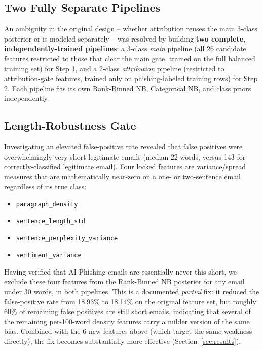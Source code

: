 \documentclass[11pt]{article}
\begin{document}
\subsection{Two Fully Separate Pipelines}
An ambiguity in the original design -- whether attribution reuses the main 3-class posterior or
is modeled separately -- was resolved by building \textbf{two complete, independently-trained
pipelines}: a 3-class \emph{main} pipeline (all 26 candidate features restricted to those that
clear the main gate, trained on the full balanced training set) for Step 1, and a 2-class
\emph{attribution} pipeline (restricted to attribution-gate features, trained only on
phishing-labeled training rows) for Step 2. Each pipeline fits its own Rank-Binned NB,
Categorical NB, and class priors independently.

\subsection{Length-Robustness Gate}
Investigating an elevated false-positive rate revealed that false positives were overwhelmingly
very short legitimate emails (median 22 words, versus 143 for correctly-classified legitimate
email). Four locked features are variance/spread measures that are mathematically near-zero on a
one- or two-sentence email regardless of its true class:
\begin{itemize}[nosep]
    \item \texttt{paragraph\_density}
    \item \texttt{sentence\_length\_std}
    \item \texttt{sentence\_perplexity\_variance}
    \item \texttt{sentiment\_variance}
\end{itemize}
Having verified that AI-Phishing emails are essentially never this short, we exclude these
four features from the Rank-Binned NB posterior for any email under 30 words, in both pipelines.
This is a documented \emph{partial} fix: it reduced the false-positive rate from 18.93\% to
18.14\% on the original feature set, but roughly 60\% of remaining false positives are still
short emails, indicating that several of the remaining per-100-word density features carry a
milder version of the same bias. Combined with the 6 new features above (which target the same
weakness directly), the fix becomes substantially more effective (Section~\ref{sec:results}).
\end{document}
